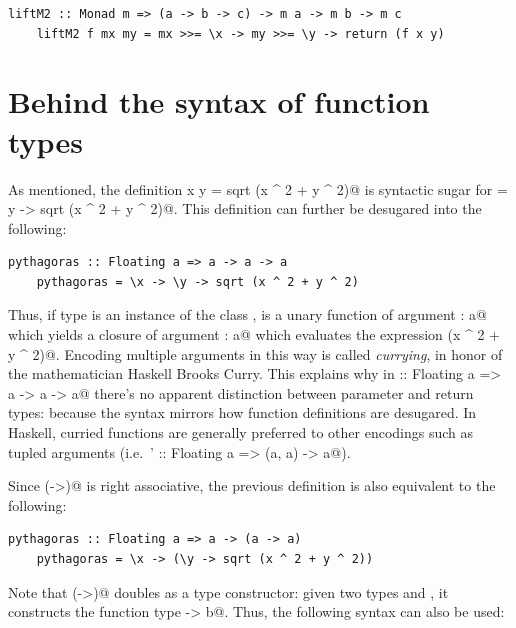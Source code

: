 \documentclass[UdineBachThesis,american,11pt]{PhdThesis}
\begin{document}
  \begin{lstlisting}[gobble=4,basicstyle=\ttfamily\small]
    liftM2 :: Monad m => (a -> b -> c) -> m a -> m b -> m c
    liftM2 f mx my = mx >>= \x -> my >>= \y -> return (f x y)
  \end{lstlisting}

  \section{Behind the syntax of function types}

  As mentioned, the definition \lstinline@pythagoras x y = sqrt (x ^ 2 + y ^ 2)@
  is syntactic sugar for \lstinline@pythagoras = \x y -> sqrt (x ^ 2 + y ^ 2)@.
  This definition can further be desugared into the following:

  \begin{lstlisting}[gobble=4,basicstyle=\ttfamily\small]
    pythagoras :: Floating a => a -> a -> a
    pythagoras = \x -> \y -> sqrt (x ^ 2 + y ^ 2)
  \end{lstlisting}

  Thus, if type \lstinline@a@ is an instance of the class \lstinline@Floating@,
  \lstinline@pythagoras@ is a unary function of argument \lstinline@x : a@ which
  yields a closure of argument \lstinline@y : a@ which evaluates the expression
  \lstinline@sqrt (x ^ 2 + y ^ 2)@. Encoding multiple arguments in this way is
  called \emph{currying}, in honor of the mathematician Haskell Brooks Curry.
  This explains why in \lstinline@pythagoras :: Floating a => a -> a -> a@
  there's no apparent distinction between parameter and return types: because
  the syntax mirrors how function definitions are desugared. In Haskell, curried
  functions are generally preferred to other encodings such as tupled arguments
  (i.e.\ \lstinline@pythagoras' :: Floating a => (a, a) -> a@).

  Since \lstinline@(->)@ is right associative, the previous definition is also
  equivalent to the following:

  \begin{lstlisting}[gobble=4,basicstyle=\ttfamily\small]
    pythagoras :: Floating a => a -> (a -> a)
    pythagoras = \x -> (\y -> sqrt (x ^ 2 + y ^ 2))
  \end{lstlisting}

  Note that \lstinline@(->)@ doubles as a type constructor: given two types
  \lstinline@a@ and \lstinline@b@, it constructs the function type
  \lstinline@a -> b@. Thus, the following syntax can also be used:
\end{document}

